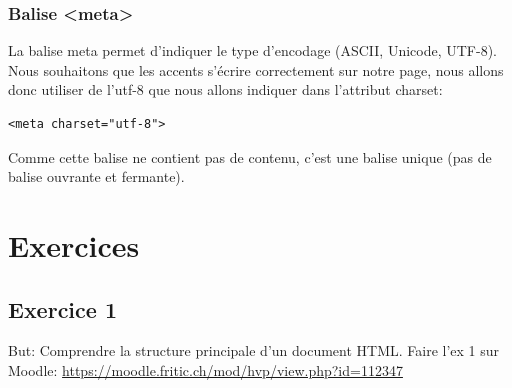 \documentclass[a4paper,11pt]{article}
\begin{document}
\subsubsection{Balise <meta>}
La balise meta permet d'indiquer le type d'encodage (ASCII, Unicode, UTF-8). Nous souhaitons que les accents s'écrire correctement sur notre page, nous allons donc utiliser de l'utf-8 que nous allons indiquer dans l'attribut charset:
\begin{lstlisting}
<meta charset="utf-8">
\end{lstlisting}
Comme cette balise ne contient pas de contenu, c'est une balise unique (pas de balise ouvrante et fermante).

\section{Exercices}
\subsection{Exercice 1}
But: Comprendre la structure principale d'un document HTML.
Faire l'ex 1 sur Moodle: \url{https://moodle.fritic.ch/mod/hvp/view.php?id=112347}
\end{document}
